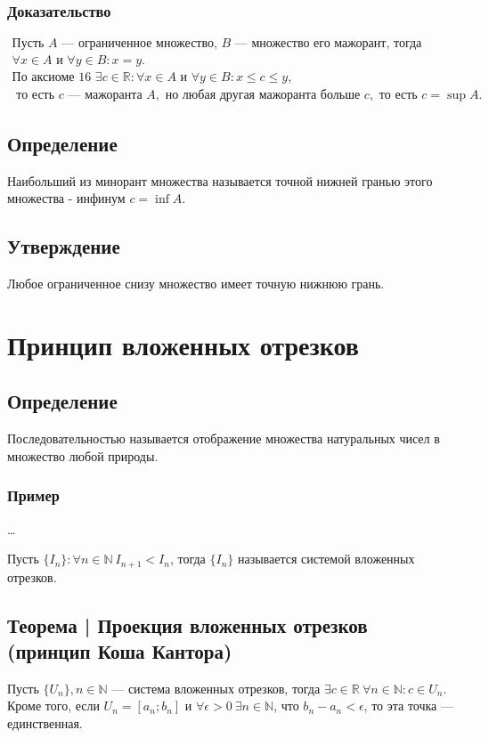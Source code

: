 \documentclass{article}
\begin{document}
\subsubsection{Доказательство}
\begin{gather*}
    \text{Пусть } A \text { --- ограниченное множество, } B \text { --- множество его мажорант, тогда} \\ 
    \forall x \in A \text{ и } \forall y \in B: x = y. \\
    \text{По аксиоме 16 } \exists c \in \mathbb{R}: \forall x \in A \text{ и } \forall y \in B: x \le c \le y, \\
    \text{ то есть } c \text{ --- мажоранта } A, \text{ но любая другая мажоранта больше } c, \text{ то есть } c = \sup A.
\end{gather*}


\subsection{Определение}
Наибольший из минорант множества называется точной нижней гранью этого множества - инфинум $c = \inf A$.


\subsection{Утверждение}
Любое ограниченное снизу множество имеет точную нижнюю грань.



\section{Принцип вложенных отрезков}

\subsection{Определение}
Последовательностью называется отображение множества натуральных чисел в множество любой природы.

\subsubsection{Пример} 
\dots

Пусть $\{I_n\}: \forall n \in \mathbb{N} ~ I_{n+1} < I_n$, тогда $\{I_n\}$ называется системой вложенных отрезков.


\subsection{Теорема | Проекция вложенных отрезков (принцип Коша Кантора)}
Пусть $\{U_n\}, n \in \mathbb{N}$ --- система вложенных отрезков, тогда $\exists c \in \mathbb{R} ~ \forall n \in \mathbb{N}: c \in U_n$. \\
Кроме того, если $U_n = [a_n ; b_n]$ и $\forall \epsilon > 0 ~ \exists n \in \mathbb{N}$, что $b_n - a_n < \epsilon$, то эта точка --- единственная.
\end{document}
